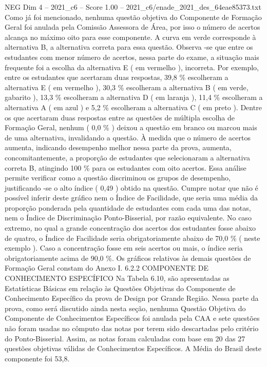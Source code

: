 \begin{textsample}{NEG Dim 4 – 2021\_c6 – Score 1.00 – 2021\_c6/enade\_2021\_des\_64eae85373.txt}
Como já foi mencionado, nenhuma questão objetiva do Componente de Formação Geral foi anulada pela Comissão Assessora de Área, por isso o número de acertos alcança no máximo oito para esse componente.
A curva em verde corresponde à alternativa B, a alternativa correta para essa questão.
Observa -se que entre os estudantes com menor número de acertos, nessa parte do exame, a situação mais frequente foi a escolha da alternativa E ( em vermelho ), incorreta.
Por exemplo, entre os estudantes que acertaram duas respostas, 39,8 \% escolheram a alternativa E ( em vermelho ), 30,3 \% escolheram a alternativa B ( em verde, gabarito ), 13,3 \% escolheram a alternativa D ( em laranja ), 11,4 \% escolheram a alternativa A ( em azul ) e 5,2 \% escolheram a alternativa C ( em preto ).
Dentre os que acertaram duas respostas entre as questões de múltipla escolha de Formação Geral, nenhum ( 0,0 \% ) deixou a questão em branco ou marcou mais de uma alternativa, invalidando a questão.
À medida que o número de acertos aumenta, indicando desempenho melhor nessa parte da prova, aumenta, concomitantemente, a proporção de estudantes que selecionaram a alternativa correta B, atingindo 100 \% para os estudantes com oito acertos.
Essa análise permite verificar como a questão discriminou os grupos de desempenho, justificando -se o alto índice ( 0,49 ) obtido na questão.
Cumpre notar que não é possível inferir deste gráfico nem o Índice de Facilidade, que seria uma média da proporção ponderada pela quantidade de estudantes com cada uma das notas, nem o Índice de Discriminação Ponto-Bisserial, por razão equivalente.
No caso extremo, no qual a grande concentração dos acertos dos estudantes fosse abaixo de quatro, o Índice de Facilidade seria obrigatoriamente abaixo de 70,0 \% ( neste exemplo ).
Caso a concentração fosse em seis acertos ou mais, o índice seria obrigatoriamente acima de 90,0 \%.
Os gráficos relativos às demais questões de Formação Geral constam do Anexo I. 6.2.2 COMPONENTE DE CONHECIMENTO ESPECÍFICO Na Tabela 6.10, são apresentadas as Estatísticas Básicas em relação às Questões Objetivas do Componente de Conhecimento Específico da prova de Design por Grande Região.
Nessa parte da prova, como será discutido ainda nesta seção, nenhuma Questão Objetiva do Componente de Conhecimentos Específicos foi anulada pela CAA e sete questões não foram usadas no cômputo das notas por terem sido descartadas pelo critério do Ponto-Bisserial.
Assim, as notas foram calculadas com base em 20 das 27 questões objetivas válidas de Conhecimentos Específicos.
A Média do Brasil deste componente foi 53,8.

\end{textsample}
